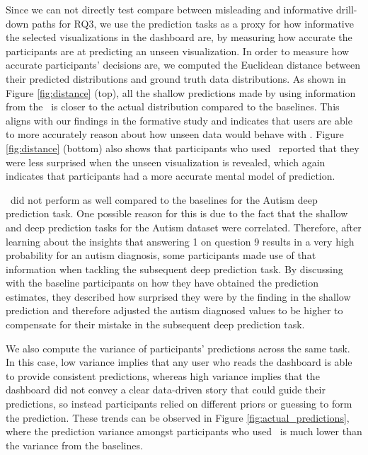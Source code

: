  Since we can not directly test compare between misleading and informative drill-down paths for RQ3, we use the prediction tasks as a proxy for how informative the selected visualizations in the dashboard are, by measuring how accurate the participants are at predicting an unseen visualization. In order to measure how accurate participants' decisions are, we computed the Euclidean distance between their predicted distributions and ground truth data distributions. As shown in Figure \ref{fig:distance} (top), all the shallow predictions made by using information from the \system\ is closer to the actual distribution compared to the baselines. This aligns with our findings in the formative study and indicates that users are able to more accurately reason about how unseen data would behave with \system. Figure \ref{fig:distance} (bottom) also shows that participants who used \system\ reported that they were less surprised when the unseen visualization is revealed, which again indicates that participants had a more accurate mental model of prediction.
\par \system\ did not perform as well compared to the baselines for the Autism deep prediction task. One possible reason for this is due to the fact that the shallow and deep prediction tasks for the Autism dataset were correlated. Therefore, after learning about the insights that answering 1 on question 9 results in a very high probability for an autism diagnosis, some participants made use of that information when tackling the subsequent deep prediction task. By discussing with the baseline participants on how they have obtained the prediction estimates, they described how surprised they were by the finding in the shallow prediction and therefore adjusted the autism diagnosed values to be higher to compensate for their mistake in the subsequent deep prediction task.
\par We also compute the variance of participants' predictions across the same task. In this case, low variance implies that any user who reads the dashboard is able to provide consistent predictions, whereas high variance implies that the dashboard did not convey a clear data-driven story that could guide their predictions, so instead participants relied on different priors or guessing to form the prediction. These trends can be observed in Figure \ref{fig:actual_predictions}, where the prediction variance amongst participants who used \system\ is much lower than the variance from the baselines.
